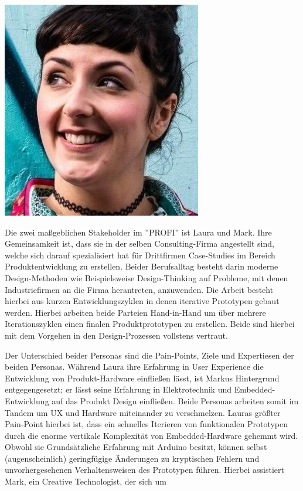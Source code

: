 \begin{tcolorbox}[title={Laura, 24, UX-Designerin},toptitle=3mm,bottomtitle=3mm, bicolor ,sidebyside,righthand width=3cm, sharp corners, boxrule=.4pt, colback=green!5, colbacklower=green!5]
    
    \tcblower
    \includegraphics[width=\linewidth]{bilder/chapter3/laura.png}
\end{tcolorbox}
Die zwei maßgeblichen Stakeholder im ''PROFI'' ist Laura und Mark. Ihre Gemeinsamkeit ist, dass sie in der selben Consulting-Firma angestellt sind, welche sich darauf spezialisiert hat für Drittfirmen Case-Studies im Bereich Produktentwicklung zu erstellen. Beider Berufsalltag besteht darin moderne Design-Methoden wie Beispielsweise Design-Thinking auf Probleme, mit denen Industriefirmen an die Firma herantreten, anzuwenden. Die Arbeit besteht hierbei aus kurzen Entwicklungszyklen in denen iterative Prototypen gebaut werden. Hierbei arbeiten beide Parteien Hand-in-Hand um über mehrere Iterationszyklen einen finalen Produktprototypen zu erstellen. Beide sind hierbei mit dem Vorgehen in den Design-Prozessen vollstens vertraut.

Der Unterschied beider Personas sind die Pain-Points, Ziele und Expertiesen der beiden Personas. Während Laura ihre Erfahrung in User Experience die Entwicklung von Produkt-Hardware einfließen lässt, ist Markus Hintergrund entgegengesetzt; er lässt seine Erfahrung in Elektrotechnik und Embedded-Entwicklung auf das Produkt Design einfließen. Beide Personas arbeiten somit im Tandem um UX und Hardware miteinander zu verschmelzen. Lauras größter Pain-Point hierbei ist, dass ein schnelles Iterieren von funktionalen Prototypen durch die enorme vertikale Komplexität von Embedded-Hardware gehemmt wird. Obwohl sie Grundsätzliche Erfahrung mit Arduino besitzt, können selbst (augenscheinlich) geringfügige Änderungen zu kryptischen Fehlern und unvorhergesehenen Verhaltensweisen des Prototypen führen. Hierbei assistiert Mark, ein Creative Technologist, der sich um 


